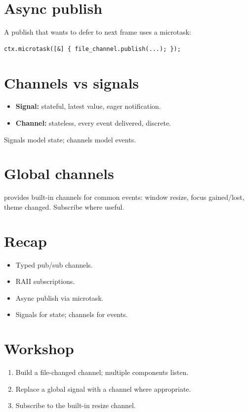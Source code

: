 \section{Async publish}

A publish that wants to defer to next frame uses a
microtask:

\begin{lstlisting}
ctx.microtask([&] { file_channel.publish(...); });
\end{lstlisting}

\section{Channels vs signals}

\begin{itemize}[leftmargin=*]
  \item \textbf{Signal:} stateful, latest value, eager
    notification.
  \item \textbf{Channel:} stateless, every event delivered,
    discrete.
\end{itemize}

Signals model state; channels model events.

\section{Global channels}

\maya{} provides built-in channels for common events:
window resize, focus gained/lost, theme changed. Subscribe
where useful.

\section{Recap}

\begin{recap}
\begin{itemize}[leftmargin=*]
  \item Typed pub/sub channels.
  \item RAII subscriptions.
  \item Async publish via microtask.
  \item Signals for state; channels for events.
\end{itemize}
\end{recap}

\section*{Workshop}

\begin{enumerate}[leftmargin=*]
  \item Build a file-changed channel; multiple components
    listen.
  \item Replace a global signal with a channel where
    appropriate.
  \item Subscribe to the built-in resize channel.
\end{enumerate}
